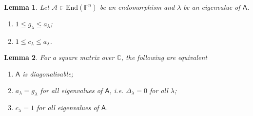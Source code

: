 \documentclass{article}
\theoremstyle{plain}\theoremheaderfont{\normalfont\itshape}\theorembodyfont{\rmfamily}\theoremseparator{.}\newtheorem*{rem}{Remark}\newtheorem*{ex}{Example}\newtheorem*{proof}{Proof}\newtheorem*{altp}{Alternative proof}
\theoremstyle{plain}\theoremheaderfont{\normalfont\bfseries}\theorembodyfont{\rmfamily}\theoremseparator{.}\newtheorem{thm}{Theorem}[section]\newtheorem{lem}[thm]{Lemma}\newtheorem{prop}[thm]{Proposition}\newtheorem*{cor}{Corollary}\newtheorem{defn}[thm]{Definition}\newtheorem{clm}[thm]{Claim}\newtheorem{clminproof}{Claim}
\theoremstyle{break}\theoremheaderfont{\normalfont\itshape}\theorembodyfont{\rmfamily}\theoremseparator{.\medskip}\newtheorem*{proofskip}{Proof}\newtheorem*{exs}{Examples}\newtheorem*{rems}{Remarks}
\theoremstyle{break}\theoremheaderfont{\normalfont\bfseries}\theorembodyfont{\rmfamily}\theoremseparator{.\medskip}\newtheorem{lemskip}[thm]{Lemma}\newtheorem{defnskip}[thm]{Definition}\newtheorem{propskip}[thm]{Proposition}\newtheorem{thmskip}[thm]{Theorem}
\numberwithin{equation}{section}
\begin{document}
	\begin{lem}
		Let \(\mathcal{A}\in\mathrm{End}(\mathbb{F}^n)\) be an endomorphism and \(\lambda\) be an eigenvalue of \(\mathsf{A}\).
		\begin{enumerate}[topsep=0pt]
			\item[(i)] \(1\le g_\lambda\le a_\lambda\);
			\item[(ii)] \(1\le c_\lambda\le a_\lambda\).
		\end{enumerate}
	\end{lem}
	\begin{lem}
		For a square matrix over \(\mathbb{C}\), the following are equivalent
		\begin{enumerate}[topsep=0pt]
			\item[(i)] \(\mathsf{A}\) is diagonalisable;
			\item[(ii)] \(a_\lambda= g_\lambda\) for all eigenvalues of \(\mathsf{A}\), i.e. \(\Delta_\lambda=0\) for all \(\lambda\);
			\item[(iii)] \(c_\lambda=1\) for all eigenvalues of \(\mathsf{A}\).
		\end{enumerate}
	\end{lem}
\end{document}
